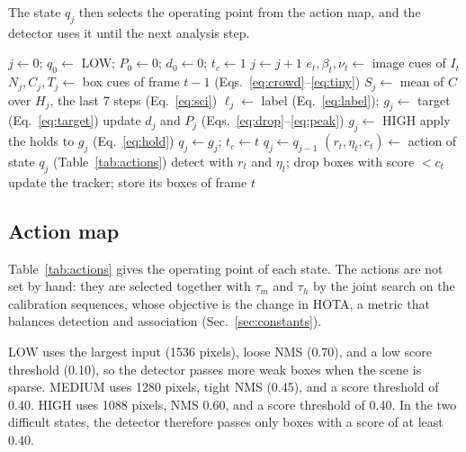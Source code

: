\documentclass[journal]{new-aiaa}
\begin{document}
The state $q_j$ then selects the operating point from the action map, and the
detector uses it until the next analysis step.

\begin{algorithm}[htbp]
\caption{AC-MOT controller for one video}\label{alg:controller}
\begin{algorithmic}[1]
\State $j\gets0$; $q_0\gets$ LOW; $P_0\gets0$; $d_0\gets0$; $t_c\gets1$
    \State $j\gets j+1$
    \State $e_t,\beta_t,\nu_t\gets$ image cues of $I_t$
    \State $N_j,C_j,T_j\gets$ box cues of frame $t-1$ (Eqs.~\ref{eq:crowd}--\ref{eq:tiny})
    \State $S_j\gets$ mean of $C$ over $H_j$, the last 7 steps (Eq.~\ref{eq:sci})
    \State $\ell_j\gets$ label (Eq.~\ref{eq:label}); $g_j\gets$ target (Eq.~\ref{eq:target})
    \State update $d_j$ and $P_j$ (Eqs.~\ref{eq:drop}--\ref{eq:peak})
     $g_j\gets$ HIGH
    \EndIf
    \State apply the holds to $g_j$ (Eq.~\ref{eq:hold})
      \State $q_j\gets g_j$; $t_c\gets t$
    \Else
      \State $q_j\gets q_{j-1}$
    \EndIf
  \EndIf
  \State $(r_t,\eta_t,c_t)\gets$ action of state $q_j$ (Table~\ref{tab:actions})
  \State detect with $r_t$ and $\eta_t$; drop boxes with score $<c_t$
  \State update the tracker; store its boxes of frame $t$
\EndFor
\end{algorithmic}
\end{algorithm}

\subsection{Action map}\label{sec:actions}
Table~\ref{tab:actions} gives the operating point of each state. The actions
are not set by hand: they are selected together with $\tau_m$ and $\tau_h$
by the joint search on the calibration sequences, whose objective is the
change in HOTA, a metric that balances detection and association
(Sec.~\ref{sec:constants}).

LOW uses the largest input (1536 pixels), loose NMS (0.70), and a low score
threshold (0.10), so the detector passes more weak boxes when the scene is
sparse. MEDIUM uses 1280 pixels, tight NMS (0.45), and a score threshold of
0.40. HIGH uses 1088 pixels, NMS 0.60, and a score threshold of 0.40. In the
two difficult states, the detector therefore passes only boxes with a score of
at least 0.40.
\end{document}
